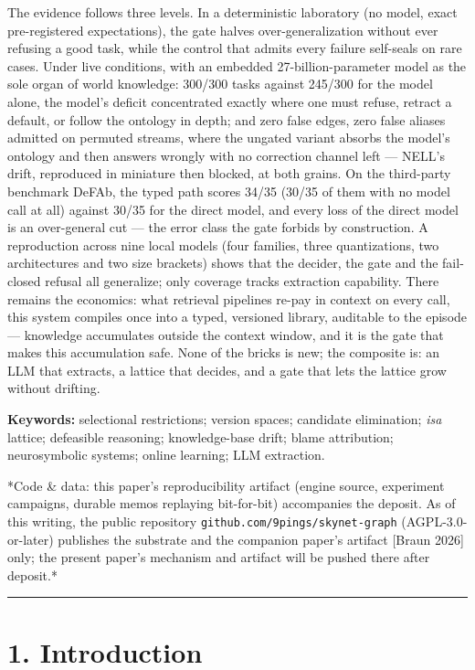 \documentclass[11pt]{article}
\begin{document}
The evidence follows three levels. In a deterministic laboratory (no model, exact pre-registered expectations), the gate halves over-generalization without ever refusing a good task, while the control that admits every failure self-seals on rare cases. Under live conditions, with an embedded 27-billion-parameter model as the sole organ of world knowledge: 300/300 tasks against 245/300 for the model alone, the model's deficit concentrated exactly where one must refuse, retract a default, or follow the ontology in depth; and zero false edges, zero false aliases admitted on permuted streams, where the ungated variant absorbs the model's ontology and then answers wrongly with no correction channel left — NELL's drift, reproduced in miniature then blocked, at both grains. On the third-party benchmark DeFAb, the typed path scores 34/35 (30/35 of them with no model call at all) against 30/35 for the direct model, and every loss of the direct model is an over-general cut — the error class the gate forbids by construction. A reproduction across nine local models (four families, three quantizations, two architectures and two size brackets) shows that the decider, the gate and the fail-closed refusal all generalize; only coverage tracks extraction capability. There remains the economics: what retrieval pipelines re-pay in context on every call, this system compiles once into a typed, versioned library, auditable to the episode — knowledge accumulates outside the context window, and it is the gate that makes this accumulation safe. None of the bricks is new; the composite is: an LLM that extracts, a lattice that decides, and a gate that lets the lattice grow without drifting.

\textbf{Keywords:} selectional restrictions; version spaces; candidate elimination; \emph{isa} lattice; defeasible reasoning; knowledge-base drift; blame attribution; neurosymbolic systems; online learning; LLM extraction.

*Code \& data: this paper's reproducibility artifact (engine source, experiment campaigns, durable memos replaying bit-for-bit) accompanies the deposit. As of this writing, the public repository \texttt{github.com/\allowbreak{}9pings/\allowbreak{}skynet-graph} (AGPL-3.0-or-later) publishes the substrate and the companion paper's artifact [Braun 2026] only; the present paper's mechanism and artifact will be pushed there after deposit.*

\medskip\hrule\medskip

\section*{1. Introduction}
\end{document}
